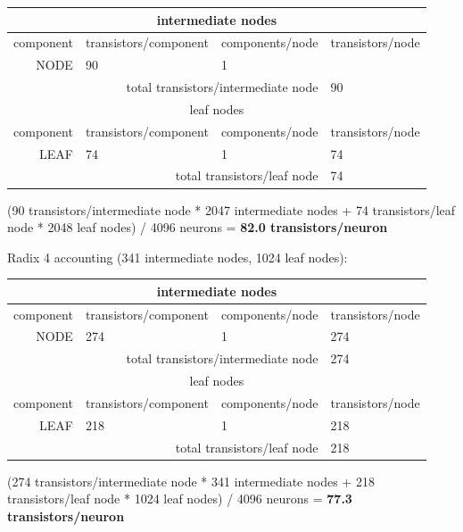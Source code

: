 \documentclass{article}
\begin{document}
\begin{center}
    \begin{tabular}{|r|l|l|l|}
    \hline \multicolumn{4}{|c|}{intermediate nodes} \\ \hline
    component & transistors/component & components/node & transistors/node \\ \hline
    NODE & 90 & 1 & \\ \hline
    \hline \multicolumn{3}{|r|}{total transistors/intermediate node} & 90 \\ \hline
    \hline \multicolumn{4}{|c|}{leaf nodes} \\ \hline
    component & transistors/component & components/node & transistors/node \\ \hline
    LEAF & 74 & 1 & 74 \\ \hline
    \hline \multicolumn{3}{|r|}{total transistors/leaf node} & 74 \\ \hline
    \end{tabular}
\end{center}

(90 transistors/intermediate node * 2047 intermediate nodes + 74 transistors/leaf node * 2048 leaf nodes) / 4096 neurons = \textbf{82.0 transistors/neuron}

\noindent
Radix 4 accounting (341 intermediate nodes, 1024 leaf nodes):

\begin{center}
    \begin{tabular}{|r|l|l|l|}
    \hline \multicolumn{4}{|c|}{intermediate nodes} \\ \hline
    component & transistors/component & components/node & transistors/node \\ \hline
    NODE & 274 & 1 & 274 \\ \hline
    \hline \multicolumn{3}{|r|}{total transistors/intermediate node} & 274 \\ \hline
    \hline \multicolumn{4}{|c|}{leaf nodes} \\ \hline
    component & transistors/component & components/node & transistors/node \\ \hline
    LEAF & 218 & 1 & 218 \\ \hline
    \hline \multicolumn{3}{|r|}{total transistors/leaf node} & 218 \\ \hline
    \end{tabular}
\end{center}

(274 transistors/intermediate node * 341 intermediate nodes + 218 transistors/leaf node * 1024 leaf nodes) / 4096 neurons = \textbf{77.3 transistors/neuron}
\end{document}
